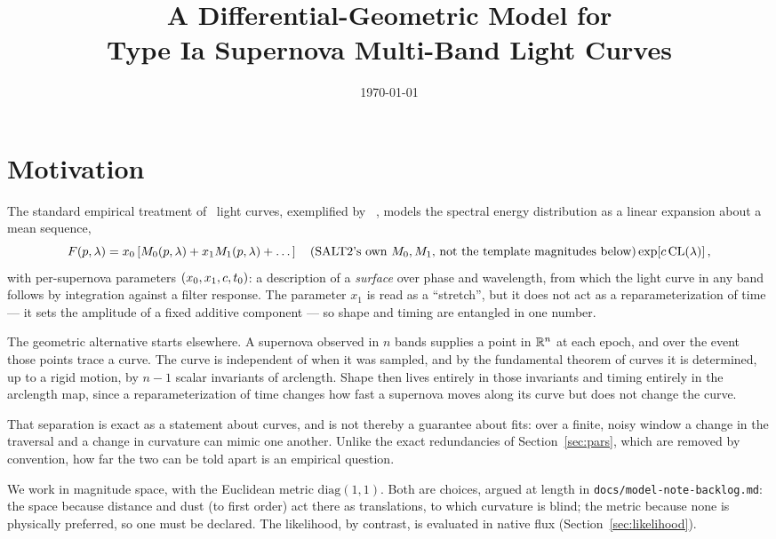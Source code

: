 \documentclass[11pt]{article}
\title{A Differential-Geometric Model for \\ Type Ia Supernova Multi-Band Light Curves}
\date{\today}
\theoremstyle{plain}
\begin{document}
\maketitle

\section{Motivation}

The standard empirical treatment of \snia\ light curves, exemplified by \salt\
\citep{Guy2007}, models the spectral energy distribution as a linear expansion about a
mean sequence,
\begin{equation}
  F(p,\lambda) = x_{0}\left[M_{0}(p,\lambda) + x_{1}M_{1}(p,\lambda) + \dots\right]
  \quad\text{(SALT2's own $M_{0}, M_{1}$, not the template magnitudes below)}
                 \exp\!\left[c\,\mathrm{CL}(\lambda)\right],
\end{equation}
with per-supernova parameters $(x_{0}, x_{1}, c, t_{0})$: a description of a
\emph{surface} over phase and wavelength, from which the light curve in any band
follows by integration against a filter response. The parameter $x_{1}$ is read as a
``stretch'', but it does not act as a reparameterization of time --- it sets the
amplitude of a fixed additive component --- so shape and timing are entangled in one
number.

The geometric alternative starts elsewhere. A supernova observed in $n$ bands
supplies a point in $\mathbb{R}^{n}$ at each epoch, and over the event those points trace a
curve. The curve is independent of when it was sampled, and by the fundamental
theorem of curves it is determined, up to a rigid motion, by $n-1$ scalar invariants
of arclength. Shape then lives entirely in those invariants and timing entirely in
the arclength map, since a reparameterization of time changes how fast a supernova
moves along its curve but does not change the curve.

That separation is exact as a statement about curves, and is not thereby a guarantee about
fits: over a finite, noisy window a change in the traversal and a change in curvature can
mimic one another. Unlike the exact redundancies of Section~\ref{sec:pars}, which
are removed by convention, how far the two can be told apart is an empirical question.


We work in magnitude space, with the Euclidean metric
$\mathrm{diag}(1,1)$. Both are choices, argued at length in
\texttt{docs/model-note-backlog.md}: the space because distance and dust (to first order)
act there as translations, to which curvature is blind; the metric because none is
physically preferred, so one must be declared. The likelihood, by contrast, is evaluated
in native flux (Section~\ref{sec:likelihood}).
\end{document}
